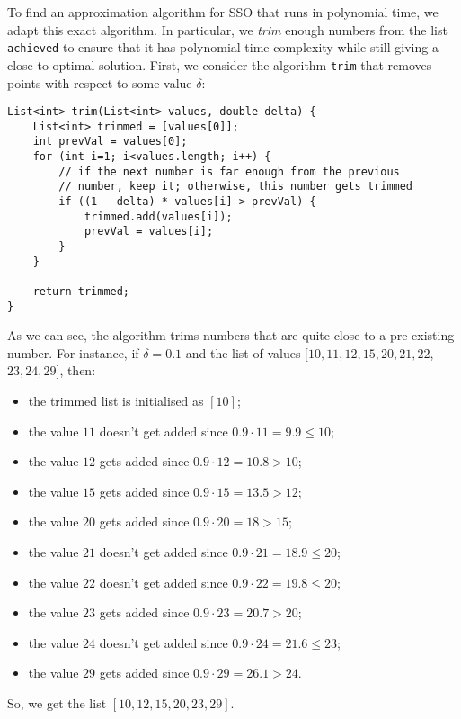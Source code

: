 \documentclass[a4paper, openany]{memoir}
\begin{document}
    To find an approximation algorithm for SSO that runs in polynomial time, we adapt this exact algorithm. In particular, we \textit{trim} enough numbers from the list \texttt{achieved} to ensure that it has polynomial time complexity while still giving a close-to-optimal solution. First, we consider the algorithm \texttt{trim} that removes points with respect to some value $\delta$:
\begin{lstlisting}[language=pseudocode]
List<int> trim(List<int> values, double delta) {
    List<int> trimmed = [values[0]];
    int prevVal = values[0];
    for (int i=1; i<values.length; i++) {
        // if the next number is far enough from the previous 
        // number, keep it; otherwise, this number gets trimmed
        if ((1 - delta) * values[i] > prevVal) {
            trimmed.add(values[i]);
            prevVal = values[i];
        }
    }

    return trimmed;
}
\end{lstlisting}
    As we can see, the algorithm trims numbers that are quite close to a pre-existing number. For instance, if $\delta = 0.1$ and the list of values $[10, 11, 12, 15, 20, 21, 22$, $23, 24, 29]$, then:
    \begin{itemize}
        \item the trimmed list is initialised as $[10]$;
        \item the value $11$ doesn't get added since $0.9 \cdot 11 = 9.9 \leq 10$;
        \item the value $12$ gets added since $0.9 \cdot 12 = 10.8 > 10$;
        \item the value $15$ gets added since $0.9 \cdot 15 = 13.5 > 12$;
        \item the value $20$ gets added since $0.9 \cdot 20 = 18 > 15$;
        \item the value $21$ doesn't get added since $0.9 \cdot 21 = 18.9 \leq 20$;
        \item the value $22$ doesn't get added since $0.9 \cdot 22 = 19.8 \leq 20$;
        \item the value $23$ gets added since $0.9 \cdot 23 = 20.7 > 20$;
        \item the value $24$ doesn't get added since $0.9 \cdot 24 = 21.6 \leq 23$;
        \item the value $29$ gets added since $0.9 \cdot 29 = 26.1 > 24$.
    \end{itemize}
    So, we get the list $[10, 12, 15, 20, 23, 29]$. 
    
\end{document}
